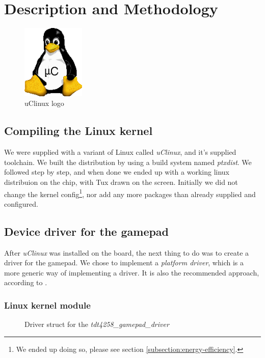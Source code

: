 \section{Description and Methodology}

\begin{figure}[h]
	\centering
	\includegraphics[width=3cm]{img/uclinux.png}
	\caption{uClinux logo}
	\label{fig:uclinux}
\end{figure}
\subsection{Compiling the Linux kernel}
We were supplied with a variant of Linux called \emph{uClinux}, and it's supplied toolchain. We built the distribution by using a build system named \emph{ptxdist}. We followed \cite[section 5.3]{compendium} step by step, and when done we ended up with a working linux distribuion on the chip, with Tux drawn on the screen. Initially we did not change the kernel config\footnote{We ended up doing so, please see section \ref{subsection:energy-efficiency}.}, nor add any more packages than already supplied and configured.

\subsection{Device driver for the gamepad}
After \emph{uClinux} was installed on the board, the next thing to do was to create a driver for the gamepad. We chose to implement a \emph{platform driver}, which is a more generic way of implementing a driver. It is also the recommended approach, according to \cite{compendium}.
\subsubsection{Linux kernel module}

\begin{figure}[h]
	\centering
	
	\caption{Driver struct for the \emph{tdt4258\_gamepad\_driver}}
	\label{fig:tdt4258-gamepad-driver}
\end{figure}

